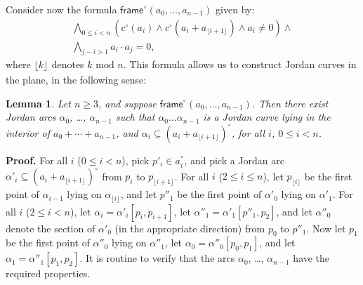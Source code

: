 \documentclass{article}
\newtheorem{lemma}[theorem]{Lemma}
\newcommand{\ic}{c^\circ}
\newcommand{\ti}[2][]{{#2}^{\circ_{#1}}}
\newcommand{\frameFlai}{\ti{\mathsf{frame}}}
\newcommand{\md}[2][] {{\lfloor#2\rfloor_{#1}}}
\newcommand{\qedsymbol}{\ding{113}}
\newenvironment{proof}{\par\noindent\textbf{Proof.}}{\mbox{}\hfill\qedsymbol\par\bigskip}
\begin{document}
Consider now the formula $\frameFlai(a_0,\ldots,a_{n-1})$ given by:
\begin{align*}
	\bigwedge_{0\leq i < n} \left(\ic(a_i)\land 
		\ic(a_i+ a_{\md{i+1}})\land a_i\neq 0 \right)\land \\
\bigwedge_{j-i>1}a_i\cdot a_j=0,	
\end{align*}
where $\md{k}$ denotes $k \mbox{ mod } n$.  This formula allows us to
construct Jordan curves in the plane, in the following sense:
\begin{lemma}\label{lma:FrameLemmaInt}
	Let $n\geq 3$, and suppose $\frameFlai(a_0, \ldots,a_{n-1})$.
        Then there exist Jordan arcs $\alpha_0$, \ldots, $\alpha_{n-1}$
        such that $\alpha_0\ldots\alpha_{n-1}$ is a Jordan curve lying in
        the interior of $a_0+\cdots+a_{n-1}$, and $\alpha_i \subseteq
        \ti{(a_i+ a_{\md{i+1}})}$, for all $i$, $0 \leq i < n$.
\end{lemma}
\begin{proof}
For all $i$ ($0 \leq i < n$), pick $p'_i \in \ti{a}_i$, and pick a Jordan arc
$\alpha'_i \subseteq \ti{(a_i + a_{\md{i+1}})}$ from $p_i$ to $p_{\md{i+1}}$.  
For all $i$ ($2 \leq i \leq n$), let $p_{\md{i}}$ be the first point
of $\alpha_{i-1}$ lying on $\alpha_{\md{i}}$, and let $p''_1$ be the
first point of $\alpha'_0$ lying on $\alpha'_1$. For all $i$ ($2 \leq
i < n$), let $\alpha_i = \alpha'_i[p_i, p_{i+1}]$, let $\alpha''_1 =
\alpha'_1[p''_1, p_2]$, and let $\alpha''_0$ denote the section of
$\alpha'_0$ (in the appropriate direction) from $p_0$ to $p''_1$. Now
let $p_1$ be the first point of $\alpha''_0$ lying on
$\alpha''_1$, let $\alpha_0 = \alpha''_0[p_0,p_1]$, and let $\alpha_1 =
\alpha''_1[p_1,p_2]$. It is routine to verify that the arcs
$\alpha_0$, \ldots, $\alpha_{n-1}$ have the required properties.
\end{proof}
\end{document}
